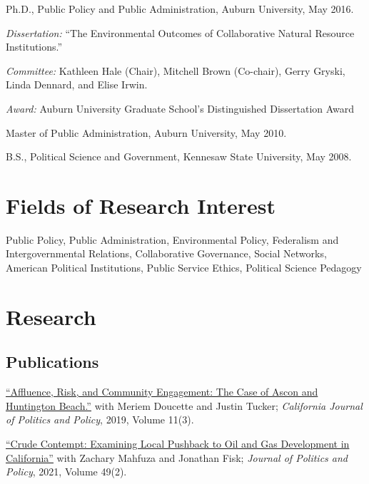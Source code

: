 \documentclass[11pt,letterpaper]{article}
\renewenvironment{itemize}{
  \begin{list}{}{
    \setlength{\leftmargin}{1.5em}
    \setlength{\itemsep}{0.25em}
    \setlength{\parskip}{0pt}
    \setlength{\parsep}{0.25em}
  }
}{
  \end{list}
}
\begin{document}
\begin{itemize}
  \item Ph.D., Public Policy and Public Administration, Auburn University, May 2016.
    \begin{itemize}\leftmargin=2pt\itemindent=-15pt
    \item \emph{Dissertation:} ``The Environmental Outcomes of Collaborative Natural Resource Institutions.'' 
    \item \emph{Committee:} Kathleen Hale (Chair), Mitchell Brown (Co-chair),
	Gerry Gryski, \\Linda Dennard, and Elise Irwin.
	\item \emph{Award:} Auburn University Graduate School's Distinguished Dissertation Award
    \end{itemize}
  \item Master of Public Administration, Auburn University, May 2010.
  \item B.S., Political Science and Government, Kennesaw State University, May 2008.
\end{itemize}

\section*{Fields of Research Interest}

Public Policy, Public Administration, Environmental Policy, Federalism and Intergovernmental Relations, Collaborative Governance, Social Networks, American Political Institutions, Public Service Ethics, Political Science Pedagogy

\section*{Research}

\subsection*{Publications}

\begin{itemize}\leftmargin=2pt\itemindent=-15pt

	\item \href{https://escholarship.org/uc/item/2mz2n6qk}{``Affluence, Risk, and Community Engagement: The Case of Ascon and Huntington Beach.''} with Meriem Doucette and Justin Tucker; \emph{California Journal of Politics and Policy}, 2019, Volume 11(3).
	
	\item \href{https://doi.org/10.1111/polp.12401}{``Crude Contempt: Examining Local Pushback to Oil and Gas Development in California''} with Zachary Mahfuza and Jonathan Fisk; \emph{Journal of Politics and Policy}, 2021, Volume 49(2).
	
\end{itemize}
\end{document}

